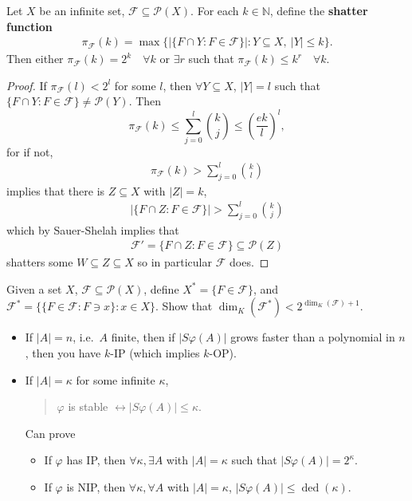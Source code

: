 \documentclass{article}
\newcommand{\named}[1]{\textbf{#1}\index{#1}}
\begin{document}
\begin{cor}
  Let $X$ be an infinite set, $\mathcal{F}\subseteq\mathcal{P}(X)$. For each $k \in \mathbb{N}$, define the \named{shatter function}
  \begin{align*}
    \pi_{\mathcal{F}}(k) = \max\{|\{F \cap Y : F \in \mathcal{F}\}| : Y \subseteq X,\ |Y| \leq k\}.
  \end{align*}
  Then either $\pi_\mathcal{F}(k) = 2^k \quad \forall k$ or $\exists r$ such that $\pi_{\mathcal{F}}(k) \leq k^r \quad \forall k$.
\end{cor}
\begin{proof}
  If $\pi_{\mathcal{F}}(l) < 2^l$ for some $l$, then $\forall Y  \subseteq X$, $|Y| = l$ such that $\{F \cap Y : F \in \mathcal{F}\} \neq \mathcal{P}(Y)$.
  Then
  \begin{equation*}
    \pi_{\mathcal{F}}(k) \leq \sum_{j=0}^l \binom{k}{j} \leq (\frac{ek}{l})^l,
  \end{equation*}
  for if not,
  \begin{align*}
    \pi_\mathcal{F}(k) > \sum_{j=0}^l \binom{k}{l}
  \end{align*}
  implies that there is $Z \subseteq X$ with $|Z|=k$,
  \begin{align*}
    |\{F \cap Z : F \in \mathcal{F}\}| > \sum_{j=0}^l \binom{k}{j}
  \end{align*}
  which by Sauer-Shelah implies that
  \begin{align*}
    \mathcal{F}' = \{F \cap Z : F \in \mathcal{F}\} \subseteq \mathcal{P}(Z)
  \end{align*}
  shatters some $W \subseteq Z \subseteq X$ so in particular $\mathcal{F}$ does.
\end{proof}
\begin{ex}
  Given a set $X$, $\mathcal{F} \subseteq \mathcal{P}(X)$, define $X^* = \{F \in \mathcal{F}\}$, and $\mathcal{F}^* = \{\{F \in \mathcal{F} : F \ni x\} : x \in X\}$.
  Show that $\dim_K(\mathcal{F}^*) < 2^{\dim_K(\mathcal{F})+1}$.
\end{ex}
\begin{itemize}
  \item If $|A| = n$, i.e.\ $A$ finite, then if $|S\varphi(A)|$ grows faster than a polynomial in $n$, then you have $k$-IP (which implies $k$-OP).
  \item If $|A| = \kappa$ for some infinite $\kappa$,
    \begin{quote}
      $\varphi$ is stable $\leftrightarrow |S\varphi(A)| \leq \kappa$.
    \end{quote}

    Can prove
    \begin{itemize}
      \item If $\varphi$ has IP, then $\forall \kappa, \exists A$ with $|A| = \kappa$ such that $|S\varphi(A)|=2^\kappa$.
      \item If $\varphi$ is NIP, then $\forall \kappa, \forall A$ with $|A| = \kappa$, $|S\varphi(A)| \leq \operatorname{ded}(\kappa)$.
    \end{itemize}
\end{itemize}
\end{document}
